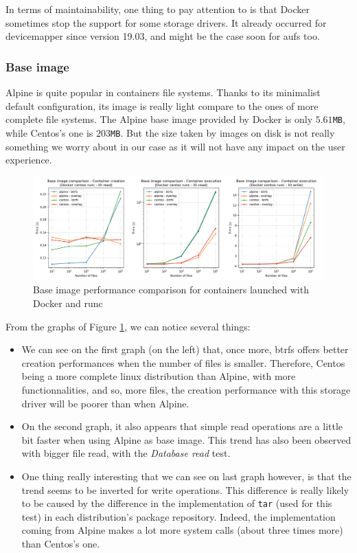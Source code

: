 In terms of maintainability, one thing to pay attention to is that Docker sometimes stop the support for some storage drivers.  It already occurred for devicemapper since version 19.03, and might be the case soon for aufs too.

\subsubsection{Base image}

Alpine is quite popular in containers file systems.  Thanks to its minimalist default configuration, its image is really light compare to the ones of more complete file systems.  The Alpine base image provided by Docker is only $5.61$\texttt{MB}, while Centos's one is $203$\texttt{MB}.  But the size taken by images on disk is not really something we worry about in our case as it will not have any impact on the user experience.

\begin{figure}[h!]
  \begin{center}
    \includegraphics[width=\linewidth]{images/question-1-base-image.png}
    \caption{Base image performance comparison for containers launched with Docker and runc}
    \label{fig:q1:base-image}
  \end{center}
\end{figure}

From the graphs of Figure \ref{fig:q1:base-image}, we can notice several things:
\begin{itemize}
  \item We can see on the first graph (on the left) that, once more, btrfs offers better creation performances when the number of files is smaller.  Therefore, Centos being a more complete linux distribution than Alpine, with more functionnalities, and so, more files, the creation performance with this storage driver will be poorer than when Alpine.
  \item On the second graph, it also appears that simple read operations are a little bit faster when using Alpine as base image.  This trend has also been observed with bigger file read, with the \textit{Database read} test.
  \item One thing really interesting that we can see on last graph however, is that the trend seems to be inverted for write operations.  This difference is really likely to be caused by the difference in the implementation of \texttt{tar} (used for this test) in each distribution's package repository.  Indeed, the implementation coming from Alpine makes a lot more system calls (about three times more) than Centos's one.
\end{itemize}

